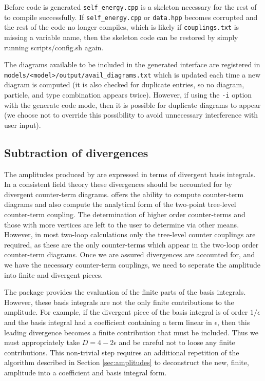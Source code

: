 Before code is generated \lstinline{self_energy.cpp} is a skeleton necessary for the rest of \mb to compile successfully.  If \lstinline{self_energy.cpp} or \lstinline{data.hpp} becomes corrupted and the rest of the code no longer compiles, which is likely if \lstinline{couplings.txt} is missing a variable name, then the skeleton code can be restored by simply running scripts/config.sh again.

The diagrams available to be included in the generated \tsil interface are registered in \lstinline{models/<model>/output/avail_diagrams.txt} which is updated each time a new diagram is computed (it is also checked for duplicate entries, so no diagram, particle, and type combination appears twice).  However, if using the \lstinline{-i} option with the generate code mode, then it is possible for duplicate diagrams to appear (we choose not to override this possibility to avoid unnecessary interference with user input).

\subsection{Subtraction of divergences}\label{sec:divergences}

The amplitudes produced by \tarcer are expressed in terms of divergent basis integrals.  In a consistent field theory these divergences should be accounted for by divergent counter-term diagrams.  \mb offers the ability to compute counter-term diagrams and also compute the analytical form of the two-point tree-level counter-term coupling.  The determination of higher order counter-terms and those with more vertices are left to the user to determine via other means.  However, in most two-loop calculations only the tree-level counter couplings are required, as these are the only counter-terms which appear in the two-loop order counter-term diagrams.  Once we are assured divergences are accounted for, and we have the necessary counter-term couplings, we need to seperate the amplitude into finite and divergent pieces.

The \tsil package provides the evaluation of the finite parts of the basis integrals.  However, these basis integrals are not the only finite contributions to the amplitude.  For example, if the divergent piece of the basis integral is of order $1/\epsilon$ and the basis integral had a coefficient containing a term linear in $\epsilon$, then this leading divergence becomes a finite contribution that must be included.  Thus we must appropriately take $D=4-2\epsilon$ and be careful not to loose any finite contributions.  This non-trivial step requires an additional repetition of the algorithm described in Section \ref{sec:amplitudes} to deconstruct the new, finite, amplitude into a coefficient and basis integral form.

